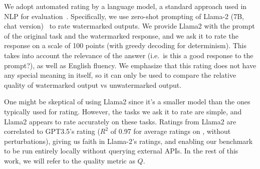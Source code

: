 We adopt automated rating by a language model, a
standard approach used in NLP for evaluation~\cite{geval,naismith23rating,chiang23rate,hackl23rating,wang23rate,kocmi23rate,chen23rate}.
%
Specifically, we use zero-shot prompting of Llama-2 (7B, chat version)~\citep{touvron_llama_2023} to rate watermarked outputs.
%
We provide Llama2 with the prompt of the original task and the watermarked response, and we ask it to rate the response on a scale of 100 points (with greedy decoding for determinism).
%
This takes into account the relevance of the answer (i.e.\ is this a good response to the prompt?), as well as English fluency.
%
%
We emphasize that this rating does not have any special meaning in itself,
so it can only be used to compare the relative quality of watermarked
output vs unwatermarked output.
%

One might be skeptical of using Llama2 since it's a smaller model than the ones typically used for rating.
%
However, the tasks we ask it to rate are simple, and Llama2 appears to rate accurately on these tasks.
%
Ratings from Llama2 are correlated to GPT3.5's rating ($R^2$ of 0.97 for average ratings on \benchmarkname{}, without perturbations), giving us faith in Llama-2's ratings, and enabling our benchmark to be run entirely locally without querying external APIs.
%
In the rest of this work, we will refer to the quality metric as $Q$. 

